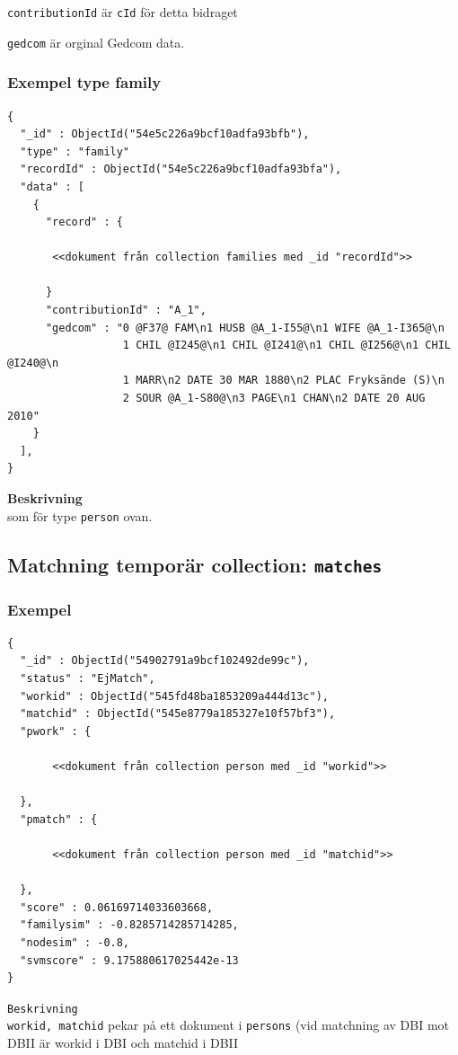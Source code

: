 \documentclass[swedish,11pt]{article}
\begin{document}
\verb+contributionId+ är \verb+cId+ för detta bidraget

\verb+gedcom+ är orginal Gedcom data.

\subsubsection{Exempel type family}
\begin{verbatim}
{
  "_id" : ObjectId("54e5c226a9bcf10adfa93bfb"),
  "type" : "family"
  "recordId" : ObjectId("54e5c226a9bcf10adfa93bfa"),
  "data" : [
    {
      "record" : {

       <<dokument från collection families med _id "recordId">>

      }
      "contributionId" : "A_1",
      "gedcom" : "0 @F37@ FAM\n1 HUSB @A_1-I55@\n1 WIFE @A_1-I365@\n
                  1 CHIL @I245@\n1 CHIL @I241@\n1 CHIL @I256@\n1 CHIL @I240@\n
                  1 MARR\n2 DATE 30 MAR 1880\n2 PLAC Fryksände (S)\n
                  2 SOUR @A_1-S80@\n3 PAGE\n1 CHAN\n2 DATE 20 AUG 2010"
    }
  ],
}
\end{verbatim}
{\bf Beskrivning}\\
som för type {\tt person} ovan.

\subsection{Matchning temporär collection: \tt matches}
\subsubsection{Exempel}
\begin{verbatim}
{
  "_id" : ObjectId("54902791a9bcf102492de99c"),
  "status" : "EjMatch",
  "workid" : ObjectId("545fd48ba1853209a444d13c"),
  "matchid" : ObjectId("545e8779a185327e10f57bf3"),
  "pwork" : {

       <<dokument från collection person med _id "workid">>

  },
  "pmatch" : {

       <<dokument från collection person med _id "matchid">>

  },
  "score" : 0.06169714033603668,
  "familysim" : -0.8285714285714285,
  "nodesim" : -0.8,
  "svmscore" : 9.175880617025442e-13
}
\end{verbatim}
{\tt Beskrivning}\\
\verb+workid, matchid+ pekar på ett dokument i \verb+persons+ (vid
matchning av DBI mot DBII är workid i DBI och matchid i DBII
\end{document}
